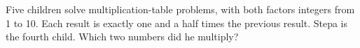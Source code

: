 Five children solve multiplication-table problems, with both factors integers from 1 to 10. Each result is exactly one and a half times the previous result. Stepa is the fourth child. Which two numbers did he multiply?
